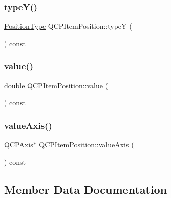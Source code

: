 \subsubsection{\texorpdfstring{typeY()}{typeY()}}
{\footnotesize\ttfamily \mbox{\hyperlink{class_q_c_p_item_position_aad9936c22bf43e3d358552f6e86dbdc8}{Position\+Type}} Q\+C\+P\+Item\+Position\+::typeY (\begin{DoxyParamCaption}{ }\end{DoxyParamCaption}) const\hspace{0.3cm}{\ttfamily [inline]}}

\mbox{\label{class_q_c_p_item_position_acfcf86f840a7366a4299bff593d5d636}} 
\subsubsection{\texorpdfstring{value()}{value()}}
{\footnotesize\ttfamily double Q\+C\+P\+Item\+Position\+::value (\begin{DoxyParamCaption}{ }\end{DoxyParamCaption}) const\hspace{0.3cm}{\ttfamily [inline]}}

\mbox{\label{class_q_c_p_item_position_a356ac94e7e73d88deb7f2841c0d0c734}} 
\subsubsection{\texorpdfstring{valueAxis()}{valueAxis()}}
{\footnotesize\ttfamily \mbox{\hyperlink{class_q_c_p_axis}{Q\+C\+P\+Axis}}$\ast$ Q\+C\+P\+Item\+Position\+::value\+Axis (\begin{DoxyParamCaption}{ }\end{DoxyParamCaption}) const\hspace{0.3cm}{\ttfamily [inline]}}



\subsection{Member Data Documentation}
\mbox{\label{class_q_c_p_item_position_add40fcb8994c247d85f42a126286b740}} 
